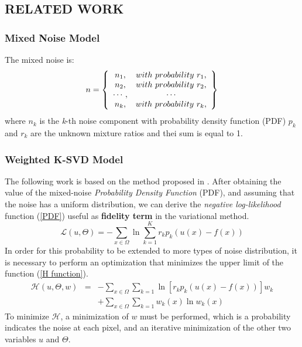 \subsection{RELATED WORK}
\subsubsection{Mixed Noise Model}
The mixed noise is:
\begin{equation}
    n = \left\{ \\
    \begin{array}{cc}
        n_1, & with~probability~r_1,\\
        n_2, & with~probability~r_2,\\
        \cdots, & \cdots\\
        n_k, & with~probability~r_k,\\ 
    \end{array}
     \right\}
\end{equation}
where $ n_k $ is the \emph{k}-th noise component with probability density function (PDF) 
$ p_k $ and $ r_k $ are the unknown mixture ratios and thei sum is equal to 1.

\subsubsection{Weighted K-SVD Model}
The following work is based on the method proposed in \cite{0884882814}. After obtaining 
the value of the mixed-noise \emph{Probability Density Function} (PDF), and 
assuming that the noise has a uniform distribution, we can derive the \emph{negative 
log-likelihood} function (\ref{PDF}) useful as {\bfseries{fidelity term}} in the variational 
method. 
\begin{equation}\label{PDF}
    \mathcal{L}(u,\Theta) = - \sum_{x\in\Omega}\ln\sum_{k=1}^Kr_kp_k(u(x)-f(x))
\end{equation}
In order for this probability to be extended to more types of noise 
distribution, it is necessary to perform an optimization that minimizes the 
upper limit of the function (\ref{H function}). 
\begin{eqnarray}\label{H function}
    \mathcal{H}(u,\Theta,w) & = & - \sum_{x\in\Omega}\sum_{k=1}\ln\left[r_kp_k(u(x)-f(x))\right]w_k \nonumber \\
                  &   & + \sum_{x\in\Omega}\sum_{k=1}w_k(x)\ln{w_k(x)}  
\end{eqnarray}
To minimize $\mathcal{H}$, a minimization of $ w $ must be performed, which is a probability 
indicates the noise at each pixel, and an iterative minimization of the other 
two variables $ u $ and $ \Theta $.

